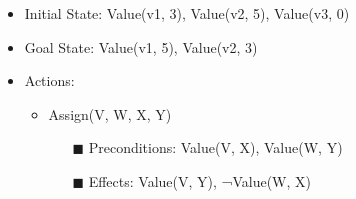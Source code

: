 \documentclass[11pt]{article}
\begin{document}
\begin{flushleft}
\begin{itemize}
    \item Initial State: Value(v1, 3), Value(v2, 5), Value(v3, 0)
    \item Goal State: Value(v1, 5), Value(v2, 3)
    \item Actions:
        \begin{itemize}
            \item Assign(V, W, X, Y)
                \begin{itemize}
                    \item[$\blacksquare$] Preconditions: Value(V, X),
                        Value(W, Y)
                    \item[$\blacksquare$] Effects: Value(V,
                        Y), ¬Value(W, X)
                \end{itemize}
        \end{itemize}
\end{itemize}


\end{flushleft}
\end{document}
